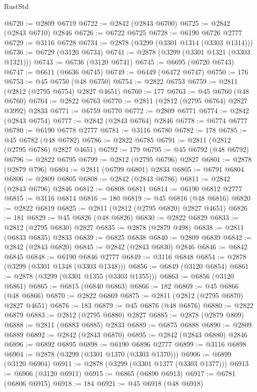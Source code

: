 \begin{lexlean}{RustStd}
\begin{coremodule}
{\begin{coremodule}
{{{{{{{{{{{{{{{{{{{{{{{{{{{{{{{{{@6720 := @2809 @6719
@6722 := @2842 (@2843 @6700)
@6725 := @2842 (@2843 @6710) @2846
@6726 := @6722 @6725
@6728 := @6190 @6726 @2777
@6729 := @3116 @6728
@6734 := @2878 (@3299 (@3301 @1314 (@3303 @1314)))
@6736 := @6729 (@3120 @6734)
@6741 := @2878 (@3299 (@3301 @1321 (@3303 @1321)))
@6743 := @6736 (@3120 @6741)
@6745 := @6695 (@6720 @6743)
@6747 := @6611 (@6636 @6745)
@6749 := @6449 (@6472 @6747)
@6750 := 176
@6753 := @45 @6750 (@48 @6750)
@6754 := @2822 @6753
@6759 := @2811 (@2812 (@2795 @6754) @2827 @4651)
@6760 := 177
@6763 := @45 @6760 (@48 @6760)
@6764 := @2822 @6763
@6770 := @2811 (@2812 (@2795 @6764) @2827 @3992) @2833
@6771 := @6759 @6770
@6772 := @2809 @6771
@6774 := @2842 (@2843 @6754)
@6777 := @2842 (@2843 @6764) @2846
@6778 := @6774 @6777
@6780 := @6190 @6778 @2777
@6781 := @3116 @6780
@6782 := 178
@6785 := @45 @6782 (@48 @6782)
@6786 := @2822 @6785
@6791 := @2811 (@2812 (@2795 @6786) @2827 @4651)
@6792 := 179
@6795 := @45 @6792 (@48 @6792)
@6796 := @2822 @6795
@6799 := @2812 (@2795 @6796) @2827
@6801 := @2878 (@2879 @796)
@6804 := @2811 (@6799 @6801) @2833
@6805 := @6791 @6804
@6806 := @2809 @6805
@6808 := @2842 (@2843 @6786)
@6811 := @2842 (@2843 @6796) @2846
@6812 := @6808 @6811
@6814 := @6190 @6812 @2777
@6815 := @3116 @6814
@6816 := 180
@6819 := @45 @6816 (@48 @6816)
@6820 := @2822 @6819
@6825 := @2811 (@2812 (@2795 @6820) @2827 @4651)
@6826 := 181
@6829 := @45 @6826 (@48 @6826)
@6830 := @2822 @6829
@6833 := @2812 (@2795 @6830) @2827
@6835 := @2878 (@2879 @498)
@6838 := @2811 (@6833 @6835) @2833
@6839 := @6825 @6838
@6840 := @2809 @6839
@6842 := @2842 (@2843 @6820)
@6845 := @2842 (@2843 @6830) @2846
@6846 := @6842 @6845
@6848 := @6190 @6846 @2777
@6849 := @3116 @6848
@6854 := @2878 (@3299 (@3301 @1348 (@3303 @1348)))
@6856 := @6849 (@3120 @6854)
@6861 := @2878 (@3299 (@3301 @1355 (@3303 @1355)))
@6863 := @6856 (@3120 @6861)
@6865 := @6815 (@6840 @6863)
@6866 := 182
@6869 := @45 @6866 (@48 @6866)
@6870 := @2822 @6869
@6875 := @2811 (@2812 (@2795 @6870) @2827 @4651)
@6876 := 183
@6879 := @45 @6876 (@48 @6876)
@6880 := @2822 @6879
@6883 := @2812 (@2795 @6880) @2827
@6885 := @2878 (@2879 @809)
@6888 := @2811 (@6883 @6885) @2833
@6889 := @6875 @6888
@6890 := @2809 @6889
@6892 := @2842 (@2843 @6870)
@6895 := @2842 (@2843 @6880) @2846
@6896 := @6892 @6895
@6898 := @6190 @6896 @2777
@6899 := @3116 @6898
@6904 := @2878 (@3299 (@3301 @1370 (@3303 @1370)))
@6906 := @6899 (@3120 @6904)
@6911 := @2878 (@3299 (@3301 @1377 (@3303 @1377)))
@6913 := @6906 (@3120 @6911)
@6915 := @6865 (@6890 @6913)
@6917 := @6781 (@6806 @6915)
@6918 := 184
@6921 := @45 @6918 (@48 @6918)
}}}}}}}}}}}}}}}}}}}}}}}}}}}}}}}}}
\end{coremodule}}
\end{coremodule}
\end{lexlean}
